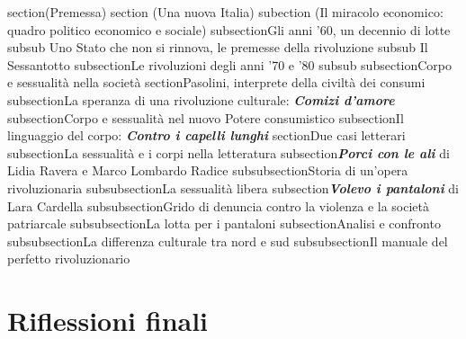 section(Premessa)
section (Una nuova Italia)
subection (Il miracolo economico: quadro politico economico e sociale)
subsection{Gli anni '60, un decennio di lotte}
subsub Uno Stato che non si rinnova, le premesse della rivoluzione
subsub Il Sessantotto
subsection{Le rivoluzioni degli anni '70 e '80}
subsub
subsection{Corpo e sessualità nella società}
section{Pasolini, interprete della civiltà dei consumi}
subsection{La speranza di una rivoluzione culturale: \textbf{\textit{Comizi d'amore}}}
subsection{Corpo e sessualità nel nuovo Potere consumistico}
subsection{Il linguaggio del corpo: \textbf{\textit{Contro i capelli lunghi}}}
section{Due casi letterari}
subsection{La sessualità e i corpi nella letteratura}
subsection{\textbf{\textit {Porci con le ali}} di Lidia Ravera e Marco Lombardo Radice}
subsubsection{Storia di un’opera rivoluzionaria}
subsubsection{La sessualità libera}
subsection{\textbf{\textit{Volevo i pantaloni}} di Lara Cardella}
subsubsection{Grido di denuncia contro la violenza e la società patriarcale}
subsubsection{La lotta per i pantaloni}
subsection{Analisi e confronto}
subsubsection{La differenza culturale tra nord e sud}
subsubsection{Il manuale del perfetto rivoluzionario}
\section{Riflessioni finali}